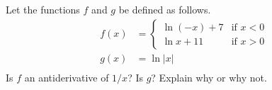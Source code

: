 Let the functions $f$ and $g$ be defined as follows.
\begin{align*}
  f(x) &=  \begin{cases}
   \ln(-x)+7 & \text{if } x < 0 \\
   \ln x+11  & \text{if } x > 0
  \end{cases}\\
  g(x) &= \ln|x| \\
\end{align*}
Is $f$ an antiderivative of $1/x$? Is $g$? Explain
why or why not.

